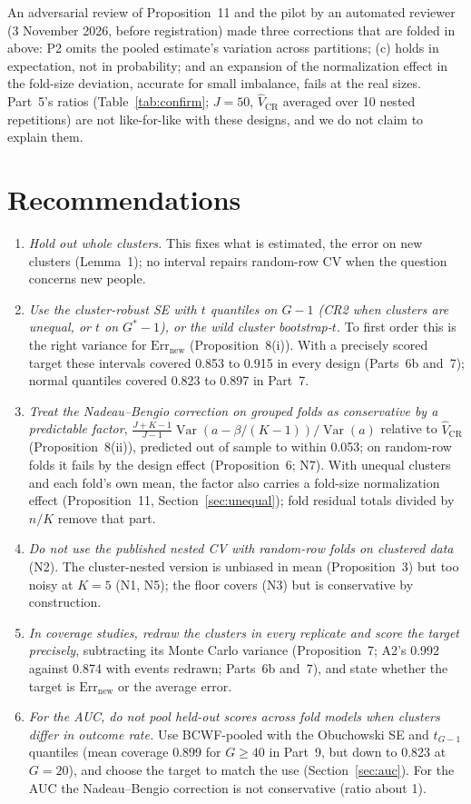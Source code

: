 \documentclass[11pt]{amsart}
\theoremstyle{plain}
\theoremstyle{definition}
\theoremstyle{remark}
\newcommand{\Var}{\operatorname{Var}}
\newcommand{\Errnew}{\mathrm{Err}_{\mathrm{new}}}
\newcommand{\VCR}{\hat V_{\mathrm{CR}}}
\newcommand{\fac}{\tfrac{J+K-1}{J-1}}
\begin{document}
An adversarial review of Proposition~11 and the pilot by an automated reviewer (3 November 2026, before registration) made three corrections that are folded in above: P2 omits the pooled estimate's variation across partitions; (c) holds in expectation, not in probability; and an expansion of the normalization effect in the fold-size deviation, accurate for small imbalance, fails at the real sizes. Part~5's ratios (Table~\ref{tab:confirm}; $J=50$, $\VCR$ averaged over 10 nested repetitions) are not like-for-like with these designs, and we do not claim to explain them.

\section{Recommendations}\label{sec:rec}

\begin{enumerate}[label=\arabic*.]
\item \emph{Hold out whole clusters.} This fixes what is estimated, the error on new clusters (Lemma~1); no interval repairs random-row CV when the question concerns new people.
\item \emph{Use the cluster-robust SE with $t$ quantiles on $G-1$ (CR2 when clusters are unequal, or $t$ on $G^*-1$), or the wild cluster bootstrap-$t$.} To first order this is the right variance for $\Errnew$ (Proposition~8(i)). With a precisely scored target these intervals covered 0.853 to 0.915 in every design (Parts~6b and~7); normal quantiles covered 0.823 to 0.897 in Part~7.
\item \emph{Treat the Nadeau--Bengio correction on grouped folds as conservative by a predictable factor}, $\fac\Var(a-\beta/(K-1))/\Var(a)$ relative to $\VCR$ (Proposition~8(ii)), predicted out of sample to within 0.053; on random-row folds it fails by the design effect (Proposition~6; N7). With unequal clusters and each fold's own mean, the factor also carries a fold-size normalization effect (Proposition~11, Section~\ref{sec:unequal}); fold residual totals divided by $n/K$ remove that part.
\item \emph{Do not use the published nested CV with random-row folds on clustered data} (N2). The cluster-nested version is unbiased in mean (Proposition~3) but too noisy at $K=5$ (N1, N5); the floor covers (N3) but is conservative by construction.
\item \emph{In coverage studies, redraw the clusters in every replicate and score the target precisely}, subtracting its Monte Carlo variance (Proposition~7; A2's 0.992 against 0.874 with events redrawn; Parts~6b and~7), and state whether the target is $\Errnew$ or the average error.
\item \emph{For the AUC, do not pool held-out scores across fold models when clusters differ in outcome rate.} Use BCWF-pooled with the Obuchowski SE and $t_{G-1}$ quantiles (mean coverage 0.899 for $G\ge40$ in Part~9, but down to 0.823 at $G=20$), and choose the target to match the use (Section~\ref{sec:auc}). For the AUC the Nadeau--Bengio correction is not conservative (ratio about 1).
\end{enumerate}
\end{document}

